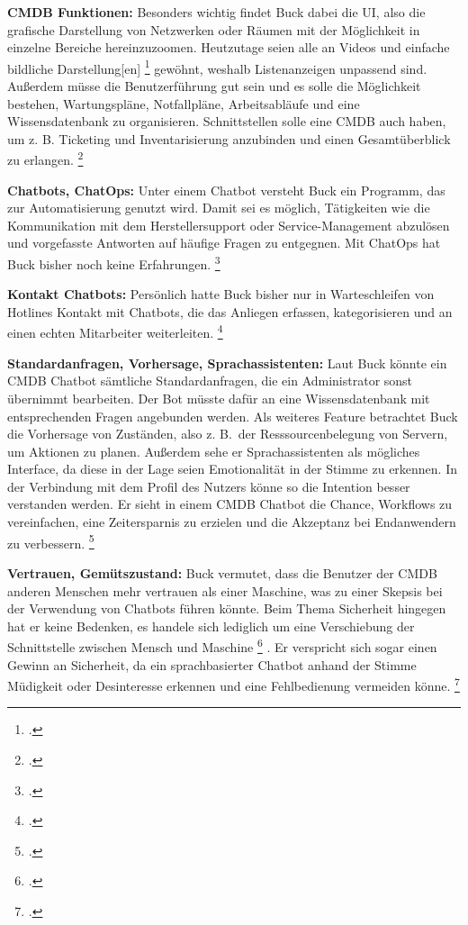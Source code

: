 \textbf{CMDB Funktionen: }Besonders wichtig findet Buck dabei die UI, also die grafische Darstellung von Netzwerken oder Räumen mit der Möglichkeit in einzelne Bereiche hereinzuzoomen. Heutzutage seien alle an Videos und \glqq{}einfache bildliche Darstellung[en]\grqq
\footcite[][o. \pno]{Buck_2019}
 gewöhnt, weshalb Listenanzeigen unpassend sind. Außerdem müsse die Benutzerführung gut sein und es solle die Möglichkeit bestehen, Wartungspläne, Notfallpläne, Arbeitsabläufe und eine Wissensdatenbank zu organisieren. Schnittstellen solle eine \acs{CMDB} auch haben, um z. B. Ticketing und Inventarisierung anzubinden und einen Gesamtüberblick zu erlangen. 
\footcite[Vgl.][o. \pno]{Buck_2019}

\textbf{Chatbots, ChatOps: }Unter einem Chatbot versteht Buck ein Programm, das zur Automatisierung genutzt wird. Damit sei es möglich, Tätigkeiten wie die Kommunikation mit dem Herstellersupport oder Service-Management abzulösen und vorgefasste Antworten auf häufige Fragen zu entgegnen. Mit ChatOps hat Buck bisher noch keine Erfahrungen.
\footcite[Vgl.][o. \pno]{Buck_2019}

\textbf{Kontakt Chatbots: }Persönlich hatte Buck bisher nur in Warteschleifen von Hotlines Kontakt mit Chatbots, die das Anliegen erfassen, kategorisieren und an einen echten Mitarbeiter weiterleiten.
\footcite[Vgl.][o. \pno]{Buck_2019}

\textbf{Standardanfragen, Vorhersage, Sprachassistenten: }Laut Buck könnte ein \acs{CMDB} Chatbot sämtliche Standardanfragen, die ein Administrator sonst übernimmt bearbeiten. Der Bot müsste dafür an eine Wissensdatenbank mit entsprechenden Fragen angebunden werden.
Als weiteres Feature betrachtet Buck die Vorhersage von Zuständen, also z. B.~der Resssourcenbelegung von Servern, um Aktionen zu planen. Außerdem sehe er Sprachassistenten als mögliches Interface, da diese in der Lage seien Emotionalität in der Stimme zu erkennen. In der Verbindung mit dem Profil des Nutzers könne so die Intention besser verstanden werden. Er sieht in einem \acs{CMDB} Chatbot die Chance, Workflows zu vereinfachen, eine Zeitersparnis zu erzielen und die Akzeptanz bei Endanwendern zu verbessern. 
\footcite[Vgl.][o. \pno]{Buck_2019}

\textbf{Vertrauen, Gemütszustand: }Buck vermutet, dass die Benutzer der \acs{CMDB} anderen Menschen mehr vertrauen als einer Maschine, was zu einer Skepsis bei der Verwendung von Chatbots führen könnte. Beim Thema Sicherheit hingegen hat er keine Bedenken, es handele sich lediglich um eine Verschiebung \glqq{}der Schnittstelle zwischen Mensch und Maschine\grqq
\footcite[][o. \pno]{Buck_2019}
. Er verspricht sich sogar einen Gewinn an Sicherheit, da ein sprachbasierter Chatbot anhand der Stimme Müdigkeit oder Desinteresse erkennen und eine Fehlbedienung vermeiden könne. 
\footcite[Vgl.][o. \pno]{Buck_2019}


